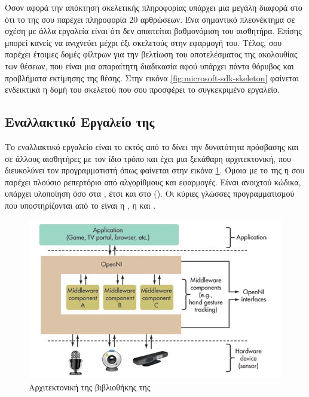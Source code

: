 Όσον αφορά την απόκτηση σκελετικής πληροφορίας υπάρχει μια μεγάλη διαφορά στο ότι το  της  σου παρέχει πληροφορία 20 αρθρώσεων. Ένα σημαντικό πλεονέκτημα σε σχέση με άλλα εργαλεία είναι ότι δεν απαιτείται βαθμονόμιση του αισθητήρα. Επίσης μπορεί κανείς να ανιχνεύει μέχρι έξι σκελετούς στην εφαρμογή του. Τέλος, σου παρέχει έτοιμες δομές φίλτρων για την βελτίωση του αποτελέσματος της ακολουθίας των θέσεων, που είναι μια απαραίτητη διαδικασία αφού υπάρχει πάντα θόρυβος και προβλήματα εκτίμησης της θέσης. Στην εικόνα \ref{fig:microsoft-sdk-skeleton} φαίνεται ενδεικτικά η δομή του σκελετού που σου προσφέρει το συγκεκριμένο εργαλείο.

\subsection{\texorpdfstring{Εναλλακτικό Εργαλείο της }{}}

Το εναλλακτικό εργαλείο είναι το  εκτός από το  δίνει την δυνατότητα πρόσβασης και σε άλλους αισθητήρες με τον ίδιο τρόπο και έχει μια ξεκάθαρη αρχιτεκτονική, που διευκολύνει τον προγραμματιστή όπως φαίνεται στην εικόνα \ref{fig:openni-framework}. Όμοια με το  της  η  σου παρέχει πλούσιο ρεπερτόριο από αλγορίθμους και εφαρμογές. Είναι ανοιχτού κώδικα, υπάρχει υλοποίηση όσο στα , έτσι και στο  (). Οι κύριες γλώσσες προγραμματισμού  που υποστηρίζονται από το  είναι η , η  και .

\begin{figure}[H]
    \centering
    \includegraphics[width=.7\textwidth, height=.3\textheight, keepaspectratio]{fig/openni-framework.jpg}
    \caption{Αρχιτεκτονική της βιβλιοθήκης της \protect\footnotemark}
    \label{fig:openni-framework}
\end{figure}

